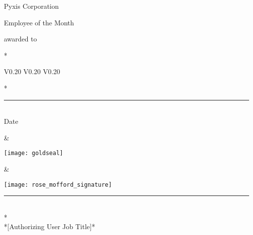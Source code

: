 \documentclass{article}
\begin{document}
\pagestyle{empty}

\begin{center}
  \begin{spacing}{7}
    {\fontsize{1cm}{1.2cm}\selectfont Pyxis Corporation}
    
    {\fontsize{2cm}{2.4cm}\selectfont Employee of the Month}
    
    {\fontsize{1cm}{1.2cm}\selectfont awarded to}
    
    {\fontsize{2cm}{2.4cm}*}
  \end{spacing}
\end{center}

\setlength{\tabcolsep}{12pt}
\begin{table}[h]
  \centering
  \begin{tabular} {V{0.20\paperwidth} V{0.20\paperwidth} V{0.20\paperwidth} }       
    \vspace{0pt}\parbox[b][1cm][b]{5cm}{\huge\selectfont {}* \\
    \rule{5cm}{0.4pt} \\
    \normalsize\selectfont \centering Date \\
    \phantom{Date}}                                                            &   
    \vspace{0pt}\parbox[b][1cm][c]{5cm}{\texttt{[image: goldseal]}} &   
    \vspace{0pt}\parbox[b][1cm][b]{5cm}{\texttt{[image: rose\_mofford\_signature]} \\
    \rule{5cm}{0.4pt} \\
    \normalsize\selectfont {}* \\
    *[Authorizing User Job Title]*}
  \end{tabular}
\end{table}
\end{document}
